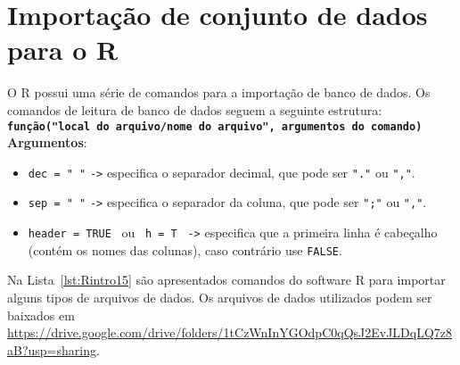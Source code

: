 \documentclass[11pt,fleqn]{book} %
\begin{document}

\section{Importação de conjunto de dados para o R}

O R possui uma série de comandos para a importação de banco de dados. Os comandos de leitura de banco de dados seguem a seguinte estrutura: \\

{\bf \texttt{função("local do arquivo/nome do arquivo", argumentos do comando)}} \\

{\bf Argumentos}:

\begin{itemize}
	\item \texttt{dec = " "} \texttt{->} especifica o separador decimal, que pode ser \texttt{"."} 
	      ou \texttt{","}.
	\item \texttt{sep = " "} \texttt{->} especifica o separador da coluna, que pode ser \texttt{";"} 
	      ou \texttt{","}.
	\item \texttt{header = TRUE} \, ou \, \texttt{h = T} \, \texttt{->} especifica que a primeira linha é cabeçalho (contém os
		  nomes das colunas), caso contrário use \texttt{FALSE}. \\
\end{itemize}


Na Lista~\ref{lst:Rintro15} são apresentados comandos do software R para importar alguns tipos de arquivos de dados. Os arquivos de dados utilizados podem ser baixados em \url{https://drive.google.com/drive/folders/1tCzWnInYGOdpC0qQsJ2EvJLDqLQ7z8aB?usp=sharing}. \\
\end{document}
